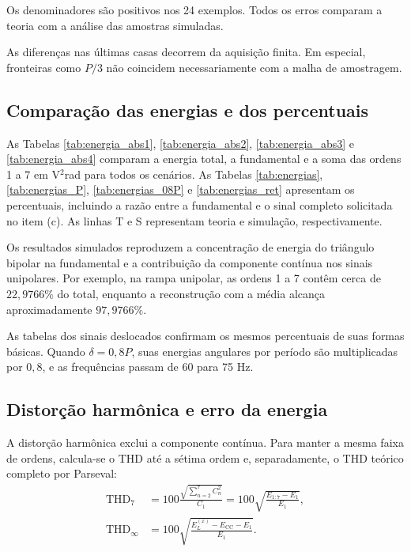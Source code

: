 Os denominadores são positivos nos 24 exemplos. Todos os erros
comparam a teoria com a análise das amostras simuladas.



As diferenças nas
últimas casas decorrem da aquisição finita. Em especial, fronteiras
como $P/3$ não coincidem necessariamente com a malha de amostragem.

\subsection{Comparação das energias e dos percentuais}
As Tabelas \ref{tab:energia_abs1}, \ref{tab:energia_abs2},
\ref{tab:energia_abs3} e \ref{tab:energia_abs4} comparam a energia
total, a fundamental e a soma das ordens 1 a 7 em V$^2$rad para
todos os cenários. As Tabelas \ref{tab:energias}, \ref{tab:energias_P},
\ref{tab:energias_08P} e \ref{tab:energias_ret} apresentam os
percentuais, incluindo a razão entre a fundamental e o sinal
completo solicitada no item (c). As linhas T e S representam
teoria e simulação, respectivamente.



Os resultados simulados reproduzem a concentração de energia do
triângulo bipolar na fundamental e a contribuição da componente
contínua nos sinais unipolares. Por exemplo, na rampa unipolar,
as ordens 1 a 7 contêm cerca de $22{,}9766\%$ do total, enquanto
a reconstrução com a média alcança aproximadamente $97{,}9766\%$.

As tabelas dos sinais deslocados confirmam os mesmos percentuais
de suas formas básicas. Quando $\delta=0{,}8P$, suas energias angulares
por período são multiplicadas por $0{,}8$, e as frequências passam
de 60 para 75 Hz.

\subsection{Distorção harmônica e erro da energia}
A distorção harmônica exclui a componente contínua. Para manter
a mesma faixa de ordens, calcula-se o THD até a
sétima ordem e, separadamente, o THD teórico completo por Parseval:
\begin{equation}
    \begin{aligned}
        \mathrm{THD}_7&=100\frac{\sqrt{\sum_{n=2}^{7}C_n^2}}{C_1}
            =100\sqrt{\frac{E_{1:7}-E_1}{E_1}}, \\
        \mathrm{THD}_{\infty}&=100\sqrt{\frac{E_L^{(x)}-E_{\mathrm{CC}}-E_1}{E_1}}.
    \end{aligned}
    \label{eq:thd}
\end{equation}


